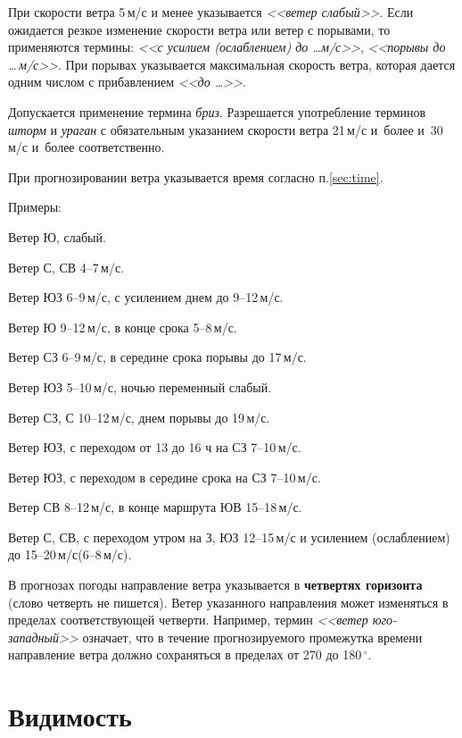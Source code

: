 \documentclass[a4paper, 12pt, twoside, final, book, russian, fittopage, cyremdash, openright]{ncc}
\newcommand{\mps}{\,м/с\xspace}
\newcommand{\gr}{\ensuremath{\,^\circ}\xspace}
\begin{document}
При скорости ветра 5\mps и менее указывается \textit{<<ветер слабый>>}. Если
ожидается резкое изменение скорости ветра или ветер с порывами, то
применяются термины: \textit{<<с усилием (ослаблением) до \ldots м/с>>}, \textit{<<порывы до
\ldots\mps>>}. При порывах указывается максимальная скорость ветра, которая
дается одним числом с прибавлением \textit{<<до \ldots>>}.

Допускается применение термина \textit{бриз}.  Разрешается употребление
терминов \textit{шторм} и \textit{ураган} с обязательным указанием скорости
ветра 21\mps и~более и~30\mps и~более соответственно.

При прогнозировании ветра указывается время согласно п.\ref{sec:time}.

Примеры:
\begin{list}{}{}
\item Ветер Ю, слабый.
\item Ветер С, СВ 4--7\mps.
\item Ветер ЮЗ 6--9\mps, с усилением днем до 9--12\mps.
\item Ветер Ю 9--12\mps, в конце срока 5--8\mps.
\item Ветер СЗ 6--9\mps, в середине срока порывы до 17\mps.
\item Ветер ЮЗ 5--10\mps, ночью переменный слабый.
\item Ветер СЗ, С 10--12\mps, днем порывы до 19\mps.
\item Ветер ЮЗ, с переходом от 13 до 16 ч на СЗ 7--10\mps.
\item Ветер ЮЗ, с переходом в середине срока на СЗ 7--10\mps.
\item Ветер СВ 8--12\mps, в конце маршрута ЮВ 15--18\mps.
\item Ветер С, СВ, с переходом утром на З, ЮЗ 12--15\mps и усилением (ослаблением) до 15--20\mps (6--8\mps).
\end{list}

В прогнозах погоды направление ветра указывается в \textbf{четвертях
  горизонта} (слово четверть не пишется). Ветер указанного направления
может изменяться в пределах соответствующей четверти. Например, термин
\textit{<<ветер юго-западный>>} означает, что в течение
прогнозируемого промежутка времени направление ветра должно
сохраняться в пределах от 270 до 180\gr.

\section{Видимость}
\label{sec:visibility}
\end{document}
